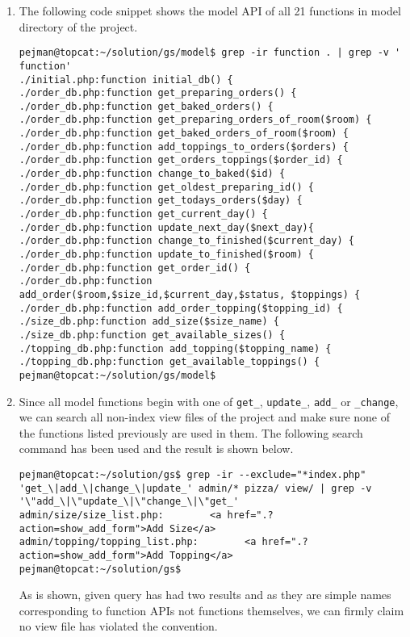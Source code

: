 \begin{enumerate}[label=(\alph*)]
\item The following code snippet shows the model API of all 21 functions in model directory of the project.
\lstset{language=bash}
\begin{lstlisting}
pejman@topcat:~/solution/gs/model$ grep -ir function . | grep -v ' function'
./initial.php:function initial_db() {
./order_db.php:function get_preparing_orders() {
./order_db.php:function get_baked_orders() {
./order_db.php:function get_preparing_orders_of_room($room) {
./order_db.php:function get_baked_orders_of_room($room) {
./order_db.php:function add_toppings_to_orders($orders) {
./order_db.php:function get_orders_toppings($order_id) {
./order_db.php:function change_to_baked($id) {
./order_db.php:function get_oldest_preparing_id() {
./order_db.php:function get_todays_orders($day) {
./order_db.php:function get_current_day() {
./order_db.php:function update_next_day($next_day){
./order_db.php:function change_to_finished($current_day) {
./order_db.php:function update_to_finished($room) {
./order_db.php:function get_order_id() {
./order_db.php:function add_order($room,$size_id,$current_day,$status, $toppings) {
./order_db.php:function add_order_topping($topping_id) {
./size_db.php:function add_size($size_name) {
./size_db.php:function get_available_sizes() {
./topping_db.php:function add_topping($topping_name) {
./topping_db.php:function get_available_toppings() {
pejman@topcat:~/solution/gs/model$
\end{lstlisting}

\item Since all model functions begin with one of \texttt{get\_}, \texttt{update\_}, \texttt{add\_} or \texttt{\_change}, we can search all non-index view files of the project and make sure none of the functions listed previously are used in them. The following search command has been used and the result is shown below.

\lstset{language=bash}
\begin{lstlisting}
pejman@topcat:~/solution/gs$ grep -ir --exclude="*index.php" 'get_\|add_\|change_\|update_' admin/* pizza/ view/ | grep -v '\"add_\|\"update_\|\"change_\|\"get_'
admin/size/size_list.php:        <a href=".?action=show_add_form">Add Size</a>
admin/topping/topping_list.php:        <a href=".?action=show_add_form">Add Topping</a>
pejman@topcat:~/solution/gs$
\end{lstlisting}
As is shown, given query has had two results and as they are simple names corresponding to function APIs not functions themselves, we can firmly claim no view file has violated the convention.


\end{enumerate}
